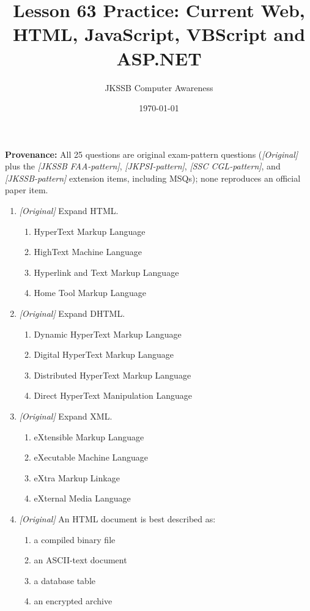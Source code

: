 \documentclass[11pt]{article}
\title{Lesson 63 Practice: Current Web, HTML, JavaScript, VBScript and ASP.NET}
\author{JKSSB Computer Awareness}
\date{\today}
\begin{document}
\maketitle
\noindent\textbf{Provenance:} All 25 questions are original exam-pattern questions (\textit{[Original]} plus the \textit{[JKSSB FAA-pattern]}, \textit{[JKPSI-pattern]}, \textit{[SSC CGL-pattern]}, and \textit{[JKSSB-pattern]} extension items, including MSQs); none reproduces an official paper item.

\begin{enumerate}[label=\textbf{Q\arabic*.}, leftmargin=*]
\item \textit{[Original]} Expand HTML.
  \begin{enumerate}[label=\Alph*.]
    \item HyperText Markup Language
    \item HighText Machine Language
    \item Hyperlink and Text Markup Language
    \item Home Tool Markup Language
  \end{enumerate}
\item \textit{[Original]} Expand DHTML.
  \begin{enumerate}[label=\Alph*.]
    \item Dynamic HyperText Markup Language
    \item Digital HyperText Markup Language
    \item Distributed HyperText Markup Language
    \item Direct HyperText Manipulation Language
  \end{enumerate}
\item \textit{[Original]} Expand XML.
  \begin{enumerate}[label=\Alph*.]
    \item eXtensible Markup Language
    \item eXecutable Machine Language
    \item eXtra Markup Linkage
    \item eXternal Media Language
  \end{enumerate}
\item \textit{[Original]} An HTML document is best described as:
  \begin{enumerate}[label=\Alph*.]
    \item a compiled binary file
    \item an ASCII-text document
    \item a database table
    \item an encrypted archive

\end{enumerate}
\end{enumerate}
\end{document}
